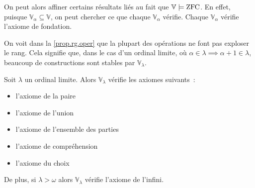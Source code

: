 On peut alors affiner certains résultats liés au fait que
$\mathbb V \models \operatorname{ZFC}$. En effet, puisque
$\mathbb V_\alpha \subseteq\mathbb V$, on peut chercher ce que chaque
$\mathbb V_\alpha$ vérifie. Chaque $\mathbb V_\alpha$ vérifie l'axiome de
fondation.

On voit dans la \cref{prop.rg.oper} que la plupart des opérations ne font pas
exploser le rang. Cela signifie que, dans le cas d'un ordinal limite, où
$\alpha \in \lambda \implies \alpha + 1 \in \lambda$, beaucoup de constructions
sont stables par $\mathbb V_\lambda$.

\begin{property}
  Soit $\lambda$ un ordinal limite. Alors $\mathbb V_\lambda$ vérifie les
  axiomes suivants~:
  \begin{itemize}
  \item l'axiome de la paire
  \item l'axiome de l'union
  \item l'axiome de l'ensemble des parties
  \item l'axiome de compréhension
  \item l'axiome du choix
  \end{itemize}

  De plus, si $\lambda > \omega$ alors $\mathbb V_\lambda$ vérifie l'axiome de
  l'infini.
\end{property}

